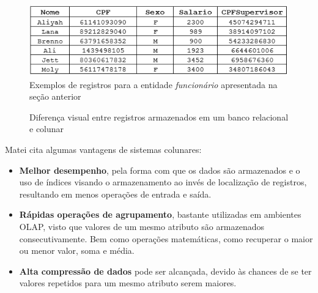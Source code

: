 \begin{figure}[htpb]
	\centering
		\includegraphics[width=12cm]{registros}
	\caption{Exemplos de registros para a entidade \textit{funcionário} apresentada na seção anterior}
	\label{fig:regs}
\end{figure}

\begin{figure}[htpb]
    \centering
    \caption{Diferença visual entre registros armazenados em um banco relacional e colunar}
    \label{fig:row-col}
\end{figure}

Matei \cite{matei2010column} cita algumas vantagens de sistemas colunares:

\begin{itemize}

    \item{\textbf{Melhor desempenho}}, pela forma com que os dados são armazenados e o uso de índices 
    visando o armazenamento ao invés de localização de registros, resultando em menos operações de 
    entrada e saída.
    \item{\textbf{Rápidas operações de agrupamento}}, bastante utilizadas em ambientes OLAP, visto 
    que valores de um mesmo atributo são armazenados consecutivamente. Bem como operações matemáticas, 
    como recuperar o maior ou menor valor, soma e média.
    \item{\textbf{Alta compressão de dados}} pode ser alcançada, devido às chances de se ter 
    valores repetidos para um mesmo atributo serem maiores.

\end{itemize}

